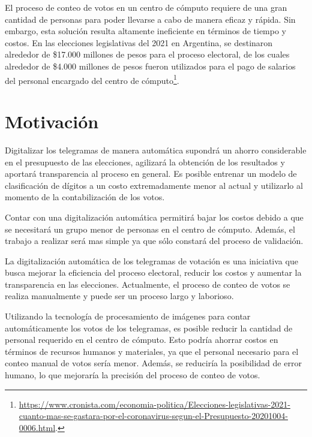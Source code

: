 El proceso de conteo de votos en un centro de cómputo requiere de una gran cantidad de personas para poder llevarse a
cabo de manera eficaz y rápida. Sin embargo, esta solución resulta altamente ineficiente en términos de tiempo y
costos. En las elecciones legislativas del 2021 en Argentina, se destinaron alrededor de \$17.000 millones de pesos
para el proceso electoral, de los cuales alrededor de \$4.000 millones de pesos fueron utilizados para el pago de
salarios del personal encargado del centro de
cómputo\footnote{\href{https://www.cronista.com/economia-politica/Elecciones-legislativas-2021-cuanto-mas-se-gastara-por-el-coronavirus-segun-el-Presupuesto-20201004-0006.html}{
        https://www.cronista.com/economia-politica/Elecciones-legislativas-2021-cuanto-mas-se-gastara-por-el-coronavirus-segun-el-Presupuesto-20201004-0006.html}.
}.

\section{Motivación}

Digitalizar los telegramas de manera automática supondrá un ahorro considerable en el presupuesto de las elecciones,
agilizará la obtención de los resultados y aportará transparencia al proceso en general. Es posible entrenar un modelo
de clasificación de dígitos a un costo extremadamente menor al actual y utilizarlo al momento de la contabilización de
los votos.

Contar con una digitalización automática permitirá bajar los costos debido a que se necesitará un grupo menor de
personas en el centro de cómputo. Además, el trabajo a realizar será mas simple ya que sólo constará del proceso de
validación.

La digitalización automática de los telegramas de votación es una iniciativa que busca mejorar la eficiencia del
proceso electoral, reducir los costos y aumentar la transparencia en las elecciones. Actualmente, el proceso de conteo
de votos se realiza manualmente y puede ser un proceso largo y laborioso.

Utilizando la tecnología de procesamiento de imágenes para contar automáticamente los votos de los telegramas, es
posible reducir la cantidad de personal requerido en el centro de cómputo. Esto podría ahorrar costos en términos de
recursos humanos y materiales, ya que el personal necesario para el conteo manual de votos sería menor. Además, se
reduciría la posibilidad de error humano, lo que mejoraría la precisión del proceso de conteo de votos.

